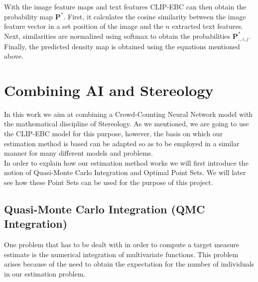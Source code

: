 With the image feature maps and text features CLIP-EBC can then obtain the probability map $\mathbf{P}^*$. First, it calculates the cosine similarity between the image feature vector in a set position of the image and the $n$ extracted text features.  %
Next, similarities are normalized using softmax to obtain the probabilities $\mathbf{P}_{:,i,j}^*$. Finally, the predicted density map is obtained using the equations mentioned above.\\





%
%
%
%
%
%
%
%
%
%
%
%
%
%
%
%
%
%
%
%
%
%
%
%
%
%
%
%
%
%
%
%
\section{Combining AI and Stereology}
In this work we aim at combining a Crowd-Counting Neural Network model with the mathematical discipline of Stereology. As we mentioned, we are going to use the CLIP-EBC model for this purpose, however, the basis on which our estimation method is based can be adapted so as to be employed in a similar manner for many different models and problems.\\

In order to explain how our estimation method works we will first introduce the notion of Quasi-Monte Carlo Integration and Optimal Point Sets. We will later see how these Point Sets can be used for the purpose of this project.\\



%
%
%
%
%
%
%
%
%
%
%
%
%
%
%
%
%
%
%
%
%
%
%
%
%
%
%
%
%
%
%
%
%
%
%
%
\subsection{Quasi-Monte Carlo Integration (QMC Integration)}

One problem that has to be dealt with in order to compute a target measure estimate is the numerical integration of multivariate functions. This problem arises because of the need to obtain the expectation for the number of individuals in our estimation problem.\\

